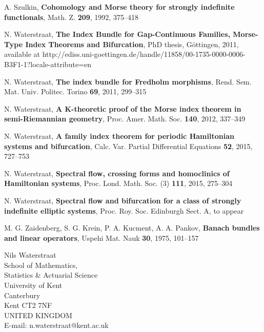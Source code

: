 \documentclass[a4paper,10pt]{article}
\begin{document}
 A. Szulkin, \textbf{Cohomology and Morse theory for strongly indefinite functionals}, Math. Z.  \textbf{209}, 1992, 375--418


 N. Waterstraat, \textbf{The Index Bundle for Gap-Continuous Families, Morse-Type Index Theorems and Bifurcation}, PhD thesis, G\"ottingen, 2011, available at http://ediss.uni-goettingen.de/handle/11858/00-1735-0000-0006-B3F1-1?locale-attribute=en

 N. Waterstraat, \textbf{The index bundle for Fredholm morphisms}, Rend. Sem. Mat. Univ. Politec. Torino \textbf{69}, 2011, 299--315

 N. Waterstraat, \textbf{A K-theoretic proof of the Morse index theorem in semi-Riemannian geometry}, Proc. Amer. Math. Soc. \textbf{140}, 2012, 337--349

 N. Waterstraat, \textbf{A family index theorem for periodic Hamiltonian systems and bifurcation}, Calc. Var. Partial Differential Equations  \textbf{52}, 2015, 727--753

 N. Waterstraat, \textbf{Spectral flow, crossing forms and homoclinics of Hamiltonian systems}, Proc. Lond. Math. Soc. (3) \textbf{111}, 2015, 275--304

 N. Waterstraat, \textbf{Spectral flow and bifurcation for a class of strongly indefinite elliptic systems}, Proc. Roy. Soc. Edinburgh Sect. A, to appear

 M. G. Zaidenberg, S. G.  Krein, P. A.  Kucment, A. A. Pankov, \textbf{Banach bundles and linear operators}, Uspehi Mat. Nauk  \textbf{30}, 1975, 101--157
		




\vspace{1cm}
Nils Waterstraat\\
School of Mathematics,\\
Statistics \& Actuarial Science\\
University of Kent\\
Canterbury\\
Kent CT2 7NF\\
UNITED KINGDOM\\
E-mail: n.waterstraat@kent.ac.uk
\end{document}
